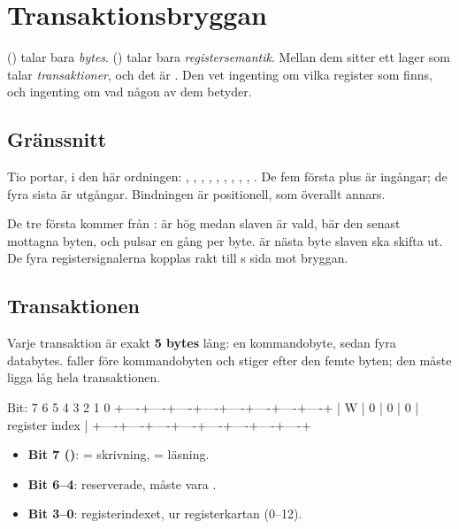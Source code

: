 
\section{Transaktionsbryggan }
\label{c19:sec:bridge}

 () talar bara \emph{bytes}. 
() talar bara \emph{registersemantik}. Mellan dem sitter ett lager som talar
\emph{transaktioner}, och det är . Den vet ingenting om vilka register som
finns, och ingenting om vad någon av dem betyder.

\subsection*{Gränssnitt}
Tio portar, i den här ordningen: , , ,
, , , , ,
, . De fem första plus  är ingångar; de fyra sista är
utgångar. Bindningen är positionell, som överallt annars.

De tre första kommer från :  är hög medan slaven är vald,
 bär den senast mottagna byten, och  pulsar en gång per byte.
 är nästa byte slaven ska skifta ut. De fyra registersignalerna kopplas rakt till
s sida mot bryggan.

\subsection*{Transaktionen}
Varje transaktion är exakt \textbf{5 bytes} lång: en kommandobyte, sedan fyra databytes. 
faller före kommandobyten och stiger efter den femte byten; den måste ligga låg hela transaktionen.

\begin{textdrawing}
Bit:      7    6    5    4    3    2    1    0
        +----+----+----+----+----+----+----+----+
        | W  | 0  | 0  | 0  |   register index  |
        +----+----+----+----+----+----+----+----+
\end{textdrawing}

\begin{itemize}
  \item \textbf{Bit 7 ()}:  = skrivning,  = läsning.
  \item \textbf{Bit 6--4}: reserverade, måste vara .
  \item \textbf{Bit 3--0}: registerindexet,  ur registerkartan (0--12).
\end{itemize}

